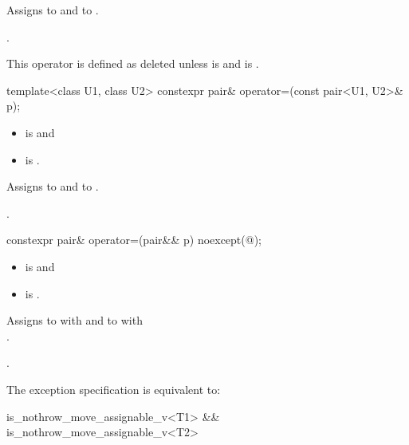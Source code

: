 \begin{itemdescr}
\pnum
\effects
Assigns  to  and  to .

\pnum
\returns
{}.

\pnum
\remarks
This operator is defined as deleted unless
 is  and
 is .
\end{itemdescr}

%
\begin{itemdecl}
template<class U1, class U2> constexpr pair& operator=(const pair<U1, U2>& p);
\end{itemdecl}

\begin{itemdescr}
\pnum
\constraints
\begin{itemize}
\item {} is  and
\item {} is .
\end{itemize}

\pnum
\effects
Assigns  to  and  to .

\pnum
\returns
{}.
\end{itemdescr}

%
\begin{itemdecl}
constexpr pair& operator=(pair&& p) noexcept(@\seebelow@);
\end{itemdecl}

\begin{itemdescr}
\pnum
\constraints
\begin{itemize}
\item {} is  and
\item {} is .
\end{itemize}

\pnum
\effects
Assigns to  with 
and to  with\\ .

\pnum
\returns
{}.

\pnum
\remarks
The exception specification is equivalent to:
\begin{codeblock}
is_nothrow_move_assignable_v<T1> && is_nothrow_move_assignable_v<T2>
\end{codeblock}
\end{itemdescr}

